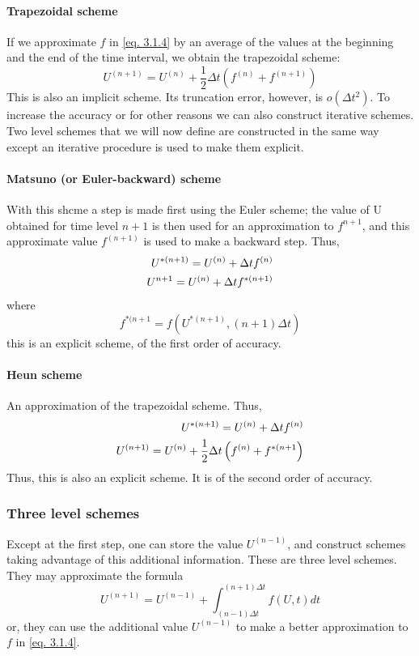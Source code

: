 \paragraph{Trapezoidal scheme}
If we approximate $f$ in \ref{eq. 3.1.4} by an average of the values at the beginning and the end of the time interval, we obtain the trapezoidal scheme:
\begin{equation}\label{3.1.7}
	U^{(n+1)}=U^{(n)}+\frac{1}{2}\Delta t\left(f^{(n)}+f^{(n+1)}\right)
\end{equation}
This is also an implicit scheme. Its truncation error, however, is $o(\Delta t^2)$. To increase the accuracy or for other reasons we can also construct iterative schemes. Two level schemes that we will now define are constructed in the same way except an iterative procedure is used to make them explicit.
\paragraph{Matsuno (or Euler-backward) scheme}
With this shcme a step is made first using the Euler scheme; the value of U obtained for time level $n+1$ is then used for an approximation to $f^{n+1}$, and this approximate value $f^{(n+1)}$ is used to make a backward step. Thus,
\begin{align}\label{3.1.8}
	U^{*(n+1)}=U^{(n)}+\Delta tf^{(n)} \\
	U^{n+1}=U^{(n)}+\Delta  tf^{*(n+1)}\notag
\end{align}
where
$$f^{*(n+1}=f\left(U^{*(n+1)}, (n+1)\Delta t\right)$$
this is an explicit scheme, of the first order of accuracy.
\paragraph{Heun scheme}
An approximation of the trapezoidal scheme. Thus,
\begin{align}
	U^{*(n+1)}=U^{(n)}+\Delta t f^{(n)} \\
	U^{(n+1)}=U^{(n)}+\frac{1}{2}\Delta t \left(f^{(n)}+f^{*(n+1}\right) \notag
\end{align}
Thus, this is also an explicit scheme. It is of the second order of accuracy.
\subsubsection{Three level schemes}
Except at the first step, one can store the value $U^{(n-1)}$, and construct schemes taking advantage of this additional information. These are three level schemes. They may approximate the formula
\begin{equation}\label{3.1.10}
	U^{(n+1)}=U^{(n-1)}+\int_{(n-1)\Delta t}^{(n+1)\Delta t}f(U,t)dt
\end{equation}
or, they can use the additional value $U^{(n-1)}$ to make a better approximation to $f$ in \ref{eq. 3.1.4}.
